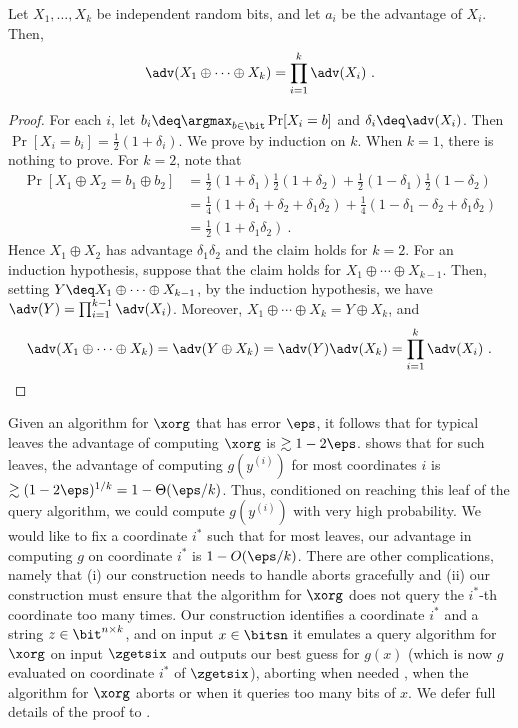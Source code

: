 \documentclass{toc}
\begin{document}
\begin{fact}\label{fact:xor-adv}
  Let $X_1,\ldots, X_k$ be independent random bits, and let $a_i$ be
  the advantage of $X_i$.  Then, $$\adv(X_1\oplus \cdots \oplus X_k) =
  \prod_{i=1}^k \adv(X_i)\ .$$
\end{fact}
\begin{proof}
  For each $i$, let $b_i \deq \argmax_{b\in \bit} \Pr[X_i = b]$ and
  $\delta_i \deq \adv(X_i)$.  Then $\Pr[X_i = b_i] =
  \frac{1}{2}(1+\delta_i)$.
  We prove  by induction on $k$.  When $k=1$,
  there is nothing to prove.  For $k=2$, note that
  \begin{align*}
    \Pr[X_1 \oplus X_2 = b_1\oplus b_2] &=
    \frac{1}{2}(1+\delta_1)\frac{1}{2}(1+\delta_2) +
    \frac{1}{2}(1-\delta_1)\frac{1}{2}(1-\delta_2) \\
    &= \frac{1}{4}(1+\delta_1+\delta_2 + \delta_1\delta_2) + \frac{1}{4}(1-\delta_1-\delta_2 + \delta_1\delta_2) \\
    &= \frac{1}{2}(1+\delta_1\delta_2)\ .
  \end{align*}
  Hence $X_1\oplus X_2$ has advantage $\delta_1\delta_2$ and the claim
  holds for $k=2$.
  For an induction hypothesis, suppose that the claim holds for
  $X_1\oplus \cdots \oplus X_{k-1}$.  Then, setting $Y \deq X_1 \oplus
  \cdots \oplus X_{k-1}$, by the induction hypothesis, we have $\adv(Y)
  = \prod_{i=1}^{k-1} \adv(X_i)$.  Moreover, $X_1\oplus \cdots \oplus
  X_k = Y\oplus X_k$, and
\begin{equation*}              %
 \adv(X_1 \oplus \cdots \oplus X_k) =
 \adv(Y\oplus X_k) = \adv(Y)\adv(X_k) = \prod_{i=1}^k \adv(X_i)\ . \qedhere
\end{equation*}
\end{proof}


Given an algorithm for $\xorg$ that has error $\eps$, it follows that
for typical leaves the advantage of computing $\xorg$ is
$\gtrsim 1-2\eps$.   shows that for such
leaves, the advantage of computing $g(y^{(i)})$ for most coordinates
$i$ is $\gtrsim (1-2\eps)^{1/k} = 1-\Theta(\eps/k)$.  Thus,
conditioned on reaching this leaf of the query algorithm, we could
compute $g(y^{(i)})$ with very high probability.  %
We would %
like to fix a
coordinate $i^*$ such that for most leaves, our advantage in computing
$g$ on coordinate $i^*$ is $1-O(\eps/k)$.  There are other
complications, namely that (i) our construction needs to handle aborts
gracefully and (ii) our construction must ensure that the algorithm
for $\xorg$ %
does not %
query the $i^*$-th coordinate too many times.  Our
construction identifies a coordinate $i^*$ and a string
$z \in \bit^{n\times k}$, and on input $x \in \bitsn$ it emulates a
query algorithm for $\xorg$ on input $\zgetsix$ and outputs our best
guess for $g(x)$ (which is now $g$ evaluated on coordinate $i^*$ of
$\zgetsix$), aborting when needed \eg, when the algorithm for
$\xorg$ aborts or when it queries too many bits of $x$.  We defer
full details of the proof to .
\end{document}
